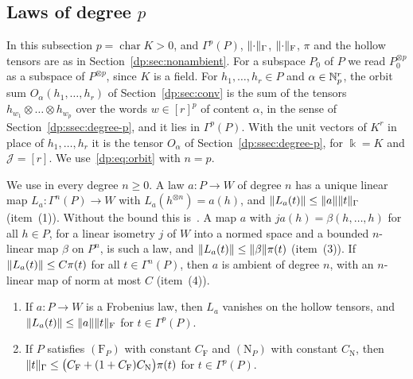 \subsection{Laws of degree \texorpdfstring{$p$}{p}}\label{dp:ac:frobenius}

In this subsection $p=\operatorname{char}K>0$, and $\Gamma^p(P)$, $\lVert \cdot\rVert_\Gamma$, $\lVert \cdot\rVert_{\mathrm F}$, $\pi$ and the hollow tensors are as in Section~\ref{dp:sec:nonambient}. For a subspace $P_0$ of $P$ we read $P_0^{\otimes p}$ as a subspace of $P^{\otimes p}$, since $K$ is a field. For $h_1,\dots,h_r\in P$ and $\alpha\in\mathbb N^r_p$, the orbit sum $O_\alpha(h_1,\dots,h_r)$ of Section~\ref{dp:sec:conv} is the sum of the tensors $h_{w_1}\otimes\dots\otimes h_{w_p}$ over the words $w\in[r]^p$ of content $\alpha$, in the sense of Section~\ref{dp:ssec:degree-p}, and it lies in $\Gamma^p(P)$. With the unit vectors of $K^r$ in place of $h_1,\dots,h_r$ it is the tensor $O_\alpha$ of Section~\ref{dp:ssec:degree-p}, for $\Bbbk=K$ and $\mathcal J=[r]$. We use~\eqref{dp:eq:orbit} with $n=p$.

We use \cite[Lemma~Q.1]{I} in every degree $n\ge0$. A law $a\colon P\to W$ of degree $n$ has a unique linear map $L_a\colon\Gamma^n(P)\to W$ with $L_a(h^{\otimes n})=a(h)$, and $\lVert L_a(t)\rVert\le\lVert a\rVert\lVert t\rVert_\Gamma$ (item~(1)). Without the bound this is~\cite[Th.~IV.1, Prop.~IV.5]{Ro}. A map $a$ with $ja(h)=\beta(h,\dots,h)$ for all $h\in P$, for a linear isometry $j$ of $W$ into a normed space and a bounded $n$\nobreakdash-linear map $\beta$ on $P^n$, is such a law, and $\lVert L_a(t)\rVert\le\lVert \beta\rVert\pi(t)$ (item~(3)). If $\lVert L_a(t)\rVert\le C\pi(t)$ for all $t\in\Gamma^n(P)$, then $a$ is ambient of degree $n$, with an $n$\nobreakdash-linear map of norm at most $C$ (item~(4)).

\begin{lemma}[linearization]\label{dp:lem:linearization}
\leavevmode
\begin{enumerate}
\item If $a\colon P\to W$ is a Frobenius law, then $L_a$ vanishes on the hollow tensors, and $\lVert L_a(t)\rVert\le\lVert a\rVert\lVert t\rVert_{\mathrm F}$ for $t\in\Gamma^p(P)$.
\item If $P$ satisfies $(\mathrm F_P)$ with constant $C_{\mathrm F}$ and $(\mathrm N_P)$ with constant $C_{\mathrm N}$, then $\lVert t\rVert_\Gamma\le\bigl(C_{\mathrm F}+(1+C_{\mathrm F})C_{\mathrm N}\bigr)\pi(t)$ for $t\in\Gamma^p(P)$.
\end{enumerate}
\end{lemma}

